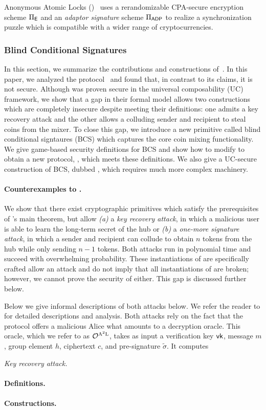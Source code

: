 Anonymous Atomic Locks (\AAL)~\cite{SP:TaiMorMaf21} uses a rerandomizable CPA-secure encryption scheme $\Pi_{\mathsf{E}}$ and an \emph{adaptor signature} scheme $\Pi_{\mathsf{ADP}}$ to realize a synchronization puzzle which is compatible with a wider range of cryptocurrencies. 


\subsubsection{Blind Conditional Signatures}
In this section, we summarize the contributions and constructions of~\cite{CCS:GMMMTT22}. In this paper, we analyzed the \AAL protocol~\cite{SP:TaiMorMaf21} and found that, in contrast to its claims, it is not secure. Although \AAL was proven secure in the universal composability (UC)~\cite{FOCS:Canetti01} framework, we show that a gap in their formal model allows two constructions which are completely insecure despite meeting their definitions: one admits a key recovery attack and the other allows a colluding sender and recipient to steal coins from the mixer. To close this gap, we introduce a new primitive called blind conditional signtaures (BCS) which captures the core coin mixing functionality. We give game-based security definitions for BCS and show how to modify \AAL to obtain a new protocol, \AALplus, which meets these definitions. We also give a UC-secure construction of BCS, dubbed \AALUC, which requires much more complex machinery. 

\paragraph{Counterexamples to \AAL.} We show that there exist cryptographic primitives which satisfy the prerequisites of \AAL's main theorem, but allow \textit{(a)} a \emph{key recovery attack}, in which a malicious user is able to learn the long-term secret of the hub or \textit{(b)} a \emph{one-more signature attack}, in which a sender and recipient can collude to obtain $n$ tokens from the hub while only sending $n-1$ tokens. Both attacks run in polynomial time and succeed with overwhelming probability. These instantiations of \AAL are specifically crafted allow an attack and do not imply that all instantiations of \AAL are broken; however, we cannot prove the security of \AAL either. This gap is discussed further below.

Below we give informal descriptions of both attacks below. We refer the reader to \cite{CCS:GMMMTT22} for detailed descriptions and analysis. Both attacks rely on the fact that the \AAL protocol offers a malicious Alice what amounts to a decryption oracle. This oracle, which we refer to as $\mathcal{O}^\text{A$^2$L}$, takes as input a verification key $\mathsf{vk}$, message $m$, group element $h$, ciphertext $c$, and pre-signature $\tilde{\sigma}$. It computes 

\textit{Key recovery attack.} 


\paragraph{Definitions.} 

\paragraph{Constructions.} 
